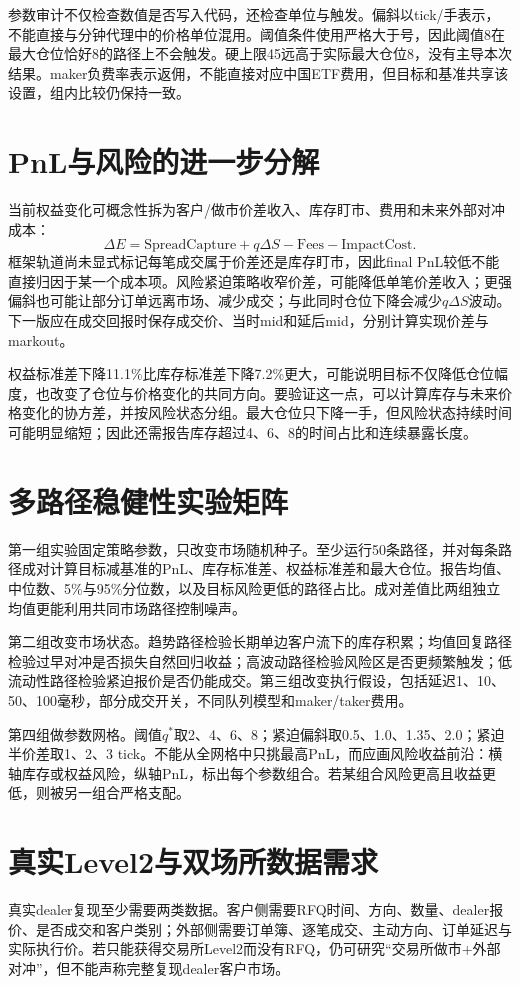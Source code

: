 \documentclass[11pt]{ctexart}
\begin{document}
参数审计不仅检查数值是否写入代码，还检查单位与触发。偏斜以tick/手表示，不能直接与分钟代理中的价格单位混用。阈值条件使用严格大于号，因此阈值8在最大仓位恰好8的路径上不会触发。硬上限45远高于实际最大仓位8，没有主导本次结果。maker负费率表示返佣，不能直接对应中国ETF费用，但目标和基准共享该设置，组内比较仍保持一致。

\section{PnL与风险的进一步分解}
当前权益变化可概念性拆为客户/做市价差收入、库存盯市、费用和未来外部对冲成本：
\[
\Delta E=\mathrm{SpreadCapture}+q\Delta S-\mathrm{Fees}-\mathrm{ImpactCost}.
\]
框架轨道尚未显式标记每笔成交属于价差还是库存盯市，因此final PnL较低不能直接归因于某一个成本项。风险紧迫策略收窄价差，可能降低单笔价差收入；更强偏斜也可能让部分订单远离市场、减少成交；与此同时仓位下降会减少$q\Delta S$波动。下一版应在成交回报时保存成交价、当时mid和延后mid，分别计算实现价差与markout。

权益标准差下降11.1\%比库存标准差下降7.2\%更大，可能说明目标不仅降低仓位幅度，也改变了仓位与价格变化的共同方向。要验证这一点，可以计算库存与未来价格变化的协方差，并按风险状态分组。最大仓位只下降一手，但风险状态持续时间可能明显缩短；因此还需报告库存超过4、6、8的时间占比和连续暴露长度。

\section{多路径稳健性实验矩阵}
第一组实验固定策略参数，只改变市场随机种子。至少运行50条路径，并对每条路径成对计算目标减基准的PnL、库存标准差、权益标准差和最大仓位。报告均值、中位数、5\%与95\%分位数，以及目标风险更低的路径占比。成对差值比两组独立均值更能利用共同市场路径控制噪声。

第二组改变市场状态。趋势路径检验长期单边客户流下的库存积累；均值回复路径检验过早对冲是否损失自然回归收益；高波动路径检验风险区是否更频繁触发；低流动性路径检验紧迫报价是否仍能成交。第三组改变执行假设，包括延迟1、10、50、100毫秒，部分成交开关，不同队列模型和maker/taker费用。

第四组做参数网格。阈值$q^*$取2、4、6、8；紧迫偏斜取0.5、1.0、1.35、2.0；紧迫半价差取1、2、3 tick。不能从全网格中只挑最高PnL，而应画风险收益前沿：横轴库存或权益风险，纵轴PnL，标出每个参数组合。若某组合风险更高且收益更低，则被另一组合严格支配。

\section{真实Level2与双场所数据需求}
真实dealer复现至少需要两类数据。客户侧需要RFQ时间、方向、数量、dealer报价、是否成交和客户类别；外部侧需要订单簿、逐笔成交、主动方向、订单延迟与实际执行价。若只能获得交易所Level2而没有RFQ，仍可研究“交易所做市+外部对冲”，但不能声称完整复现dealer客户市场。
\end{document}
